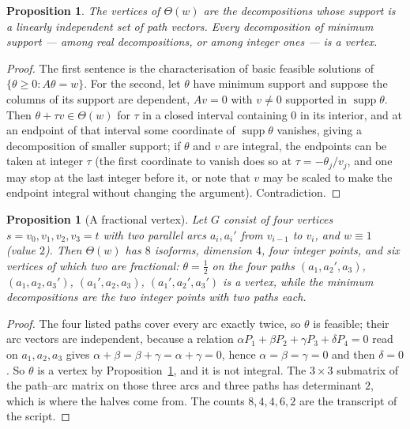 \documentclass[11pt]{article}
\theoremstyle{plain}
\newtheorem{proposition}[theorem]{Proposition}
\theoremstyle{definition}
\theoremstyle{remark}
\newcommand{\supp}{\operatorname{supp}}
\newcommand{\Th}{\Theta}
\begin{document}
\begin{proposition}\label{prop:vertex}
The vertices of $\Th(w)$ are the decompositions whose support is a linearly independent set
of path vectors. Every decomposition of minimum support --- among real decompositions, or
among integer ones --- is a vertex.
\end{proposition}

\begin{proof}
The first sentence is the characterisation of basic feasible solutions of
$\{\theta\ge0:A\theta=w\}$. For the second, let $\theta$ have minimum support and suppose the
columns of its support are dependent, $Av=0$ with $v\ne0$ supported in $\supp\theta$. Then
$\theta+\tau v\in\Th(w)$ for $\tau$ in a closed interval containing $0$ in its interior, and
at an endpoint of that interval some coordinate of $\supp\theta$ vanishes, giving a
decomposition of smaller support; if $\theta$ and $v$ are integral, the endpoints can be
taken at integer $\tau$ (the first coordinate to vanish does so at $\tau=-\theta_j/v_j$, and
one may stop at the last integer before it, or note that $v$ may be scaled to make the
endpoint integral without changing the argument). Contradiction.
\end{proof}

\begin{proposition}[A fractional vertex]\label{prop:frac}
Let $G$ consist of four vertices $s=v_0,v_1,v_2,v_3=t$ with two parallel arcs
$a_i,a_i'$ from $v_{i-1}$ to $v_i$, and $w\equiv1$ (value $2$). Then $\Th(w)$ has $8$
isoforms, dimension $4$, four integer points, and six vertices of which two are fractional:
$\theta=\tfrac12$ on the four paths $(a_1,a_2',a_3)$, $(a_1,a_2,a_3')$, $(a_1',a_2,a_3)$,
$(a_1',a_2',a_3')$ is a vertex, while the minimum decompositions are the two integer
points with two paths each.
\end{proposition}

\begin{proof}
The four listed paths cover every arc exactly twice, so $\theta$ is feasible; their arc
vectors are independent, because a relation $\alpha P_1+\beta P_2+\gamma P_3+\delta P_4=0$
read on $a_1,a_2,a_3$ gives $\alpha+\beta=\beta+\gamma=\alpha+\gamma=0$, hence
$\alpha=\beta=\gamma=0$ and then $\delta=0$. So $\theta$ is a vertex by
Proposition~\ref{prop:vertex}, and it is not integral. The $3\times3$ submatrix of the
path--arc matrix on those three arcs and three paths has determinant $2$, which is where the
halves come from. The counts $8,4,4,6,2$ are the transcript of the script.
\end{proof}
\end{document}
